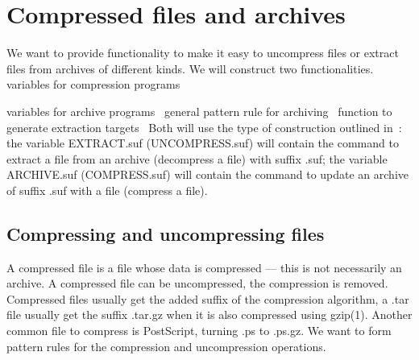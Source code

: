 \section{Compressed files and archives}

We want to provide functionality to make it easy to uncompress files or extract 
files from archives of different kinds.
We will construct two functionalities.
\nwenddocs{}\endmoddef\nwstartdeflinemarkup{}\nwenddeflinemarkup
\LA{}variables for compression programs~{\nwtagstyle{}}\RA{}

\LA{}variables for archive programs~{\nwtagstyle{}}\RA{}
\LA{}general pattern rule for archiving~{\nwtagstyle{}}\RA{}
\LA{}function to generate extraction targets~{\nwtagstyle{}}\RA{}
\nwendcode{}Both will use the type of construction outlined in~\cite[Sect.\ 
10.2]{GNUMake}:
the variable {\Tt{}EXTRACT.suf\nwendquote} ({\Tt{}UNCOMPRESS.suf\nwendquote}) will contain the command to 
extract a file from an archive (decompress a file) with suffix {\Tt{}.suf\nwendquote};
the variable {\Tt{}ARCHIVE.suf\nwendquote} ({\Tt{}COMPRESS.suf\nwendquote}) will contain the command to 
update an archive of suffix {\Tt{}.suf\nwendquote} with a file (compress a file).

\subsection{Compressing and uncompressing files}
\label{CompressingFiles}

A compressed file is a file whose data is compressed --- this is not 
necessarily an archive.
A compressed file can be uncompressed, \ie the compression is removed.
Compressed files usually get the added suffix of the compression algorithm, 
\eg a {\Tt{}.tar\nwendquote} file usually get the suffix {\Tt{}.tar.gz\nwendquote} when it is also 
compressed using gzip(1).
Another common file to compress is PostScript, \ie turning {\Tt{}.ps\nwendquote} to 
{\Tt{}.ps.gz\nwendquote}.
We want to form pattern rules for the compression and uncompression operations.

